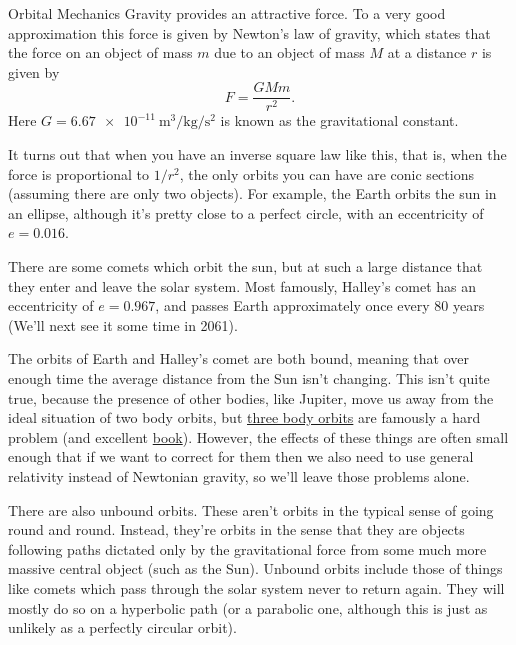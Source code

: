 \documentclass[fleqn]{LectureClass/LectureClass}
\begin{document}
    \begin{app}{Orbital Mechanics}{}
        Gravity provides an attractive force.
        To a very good approximation this force is given by Newton's law of gravity, which states that the force on an object of mass \(m\) due to an object of mass \(M\) at a distance \(r\) is given by
        \begin{equation}
            F = \frac{GMm}{r^2}.
        \end{equation}
        Here \(G = \qty{6.67e-11}{\metre\cubed\per\kilogram\per\second\squared}\) is known as the gravitational constant.
        
        It turns out that when you have an inverse square law like this, that is, when the force is proportional to \(1/r^2\), the only orbits you can have are conic sections (assuming there are only two objects).
        For example, the Earth orbits the sun in an ellipse, although it's pretty close to a perfect circle, with an eccentricity of \(e = 0.016\).
        
        There are some comets which orbit the sun, but at such a large distance that they enter and leave the solar system.
        Most famously, Halley's comet has an eccentricity of \(e = 0.967\), and passes Earth approximately once every 80 years (We'll next see it some time in 2061).
        
        The orbits of Earth and Halley's comet are both bound, meaning that over enough time the average distance from the Sun isn't changing.
        This isn't quite true, because the presence of other bodies, like Jupiter, move us away from the ideal situation of two body orbits, but \href{https://en.wikipedia.org/wiki/Three-body_problem}{three body orbits} are famously a hard problem (and excellent \href{https://en.wikipedia.org/wiki/The_Three-Body_Problem_(novel)}{book}).
        However, the effects of these things are often small enough that if we want to correct for them then we also need to use general relativity instead of Newtonian gravity, so we'll leave those problems alone.
        
        There are also unbound orbits.
        These aren't orbits in the typical sense of going round and round.
        Instead, they're orbits in the sense that they are objects following paths dictated only by the gravitational force from some much more massive central object (such as the Sun).
        Unbound orbits include those of things like comets which pass through the solar system never to return again.
        They will mostly do so on a hyperbolic path (or a parabolic one, although this is just as unlikely as a perfectly circular orbit).
    \end{app}
    
\end{document}
